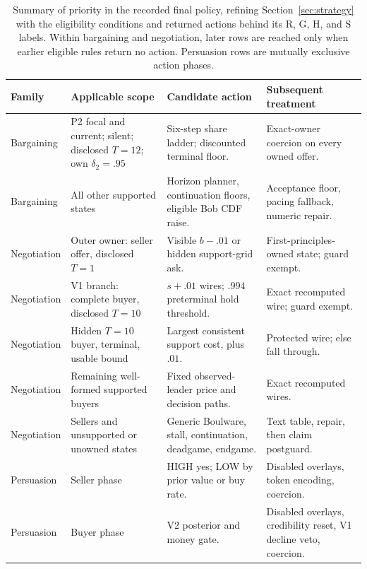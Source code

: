 \begin{table}[H]
\centering
\scriptsize
\caption{Summary of priority in the recorded final policy, refining
Section~\ref{sec:strategy} with the eligibility conditions and returned actions
behind its R, G, H, and S labels. Within bargaining and negotiation, later rows
are reached only when earlier eligible rules return no action. Persuasion rows
are mutually exclusive action phases.}
\label{tab:policy-precedence}
\setlength{\tabcolsep}{3.0pt}
\renewcommand{\arraystretch}{0.96}
\begin{tabularx}{\linewidth}{@{}>{\raggedright\arraybackslash}p{1.25cm}>{\raggedright\arraybackslash}p{3.15cm}Y>{\raggedright\arraybackslash}p{2.65cm}@{}}
\toprule
Family & Applicable scope & Candidate action & Subsequent treatment \\
\midrule
Bargaining & P2 focal and current; silent; disclosed $T=12$; own $\delta_2=.95$ & Six-step share ladder; discounted terminal floor. & Exact-owner coercion on every owned offer. \\
Bargaining & All other supported states & Horizon planner, continuation floors, eligible Bob CDF raise. & Acceptance floor, pacing fallback, numeric repair. \\
Negotiation & Outer owner: seller offer, disclosed $T=1$ & Visible $b-.01$ or hidden support-grid ask. & First-principles-owned state; guard exempt. \\
Negotiation & V1 branch: complete buyer, disclosed $T=10$ & $s+.01$ wires; $.994$ preterminal hold threshold. & Exact recomputed wire; guard exempt. \\
Negotiation & Hidden $T=10$ buyer, terminal, usable bound & Largest consistent support cost, plus $.01$. & Protected wire; else fall through. \\
Negotiation & Remaining well-formed supported buyers & Fixed observed-leader price and decision paths. & Exact recomputed wires. \\
Negotiation & Sellers and unsupported or unowned states & Generic Boulware, stall, continuation, deadgame, endgame. & Text table, repair, then claim postguard. \\
Persuasion & Seller phase & HIGH yes; LOW by prior value or buy rate. & Disabled overlays, token encoding, coercion. \\
Persuasion & Buyer phase & V2 posterior and money gate. & Disabled overlays, credibility reset, V1 decline veto, coercion. \\
\bottomrule
\end{tabularx}
\end{table}

